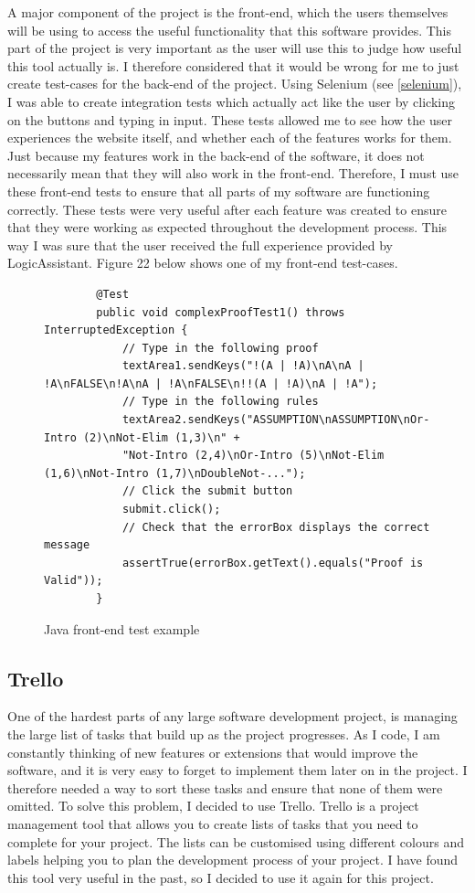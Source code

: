 A major component of the project is the front-end, which the users themselves will be using to access the useful functionality that this software provides. This part of the project is very important as the user will use this to judge how useful this tool actually is. I therefore considered that it would be wrong for me to just create test-cases for the back-end of the project. Using Selenium (see \ref{selenium}), I was able to create integration tests which actually act like the user by clicking on the buttons and typing in input. These tests allowed me to see how the user experiences the website itself, and whether each of the features works for them. Just because my features work in the back-end of the software, it does not necessarily mean that they will also work in the front-end. Therefore, I must use these front-end tests to ensure that all parts of my software are functioning correctly. These tests were very useful after each feature was created to ensure that they were working as expected throughout the development process. This way I was sure that the user received the full experience provided by LogicAssistant. Figure 22 below shows one of my front-end test-cases.

\begin{figure}[!ht]
\begin{lstlisting}
		@Test
		public void complexProofTest1() throws InterruptedException {
			// Type in the following proof
			textArea1.sendKeys("!(A | !A)\nA\nA | !A\nFALSE\n!A\nA | !A\nFALSE\n!!(A | !A)\nA | !A");
			// Type in the following rules
			textArea2.sendKeys("ASSUMPTION\nASSUMPTION\nOr-Intro (2)\nNot-Elim (1,3)\n" + 
			"Not-Intro (2,4)\nOr-Intro (5)\nNot-Elim (1,6)\nNot-Intro (1,7)\nDoubleNot-...");
			// Click the submit button
			submit.click();
			// Check that the errorBox displays the correct message
			assertTrue(errorBox.getText().equals("Proof is Valid"));
		}
\end{lstlisting}

\caption{Java front-end test example}
\end{figure}

\subsection{Trello \label{trello}}

One of the hardest parts of any large software development project, is managing the large list of tasks that build up as the project progresses. As I code, I am constantly thinking of new features or extensions that would improve the software, and it is very easy to forget to implement them later on in the project. I therefore needed a way to sort these tasks and ensure that none of them were omitted. To solve this problem, I decided to use Trello. Trello is a project management tool that allows you to create lists of tasks that you need to complete for your project. The lists can be customised using different colours and labels helping you to plan the development process of your project. I have found this tool very useful in the past, so I decided to use it again for this project.

